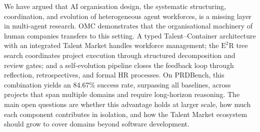 \documentclass[11pt,a4paper]{article}
\begin{document}
We have argued that AI organisation design, the systematic structuring, coordination, and evolution of heterogeneous agent workforces, is a missing layer in multi-agent research.  OMC demonstrates that the organisational machinery of human companies transfers to this setting.  A typed Talent--Container architecture with an integrated Talent Market handles workforce management; the $\text{E}^2$R tree search coordinates project execution through structured decomposition and review gates; and a self-evolution pipeline closes the feedback loop through reflection, retrospectives, and formal HR processes.  On PRDBench, this combination yields an 84.67\% success rate, surpassing all baselines, across projects that span multiple domains and require long-horizon reasoning.  The main open questions are whether this advantage holds at larger scale, how much each component contributes in isolation, and how the Talent Market ecosystem should grow to cover domains beyond software development.

\clearpage


\clearpage

\end{document}
